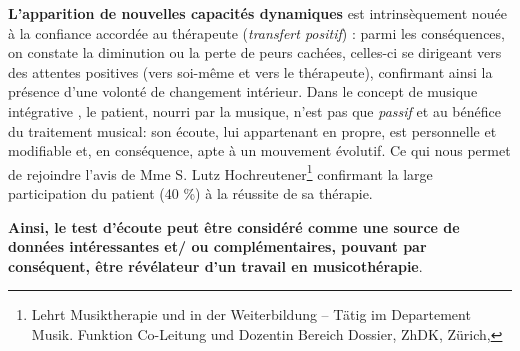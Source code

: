 \begin{itemize}
 \textbf{L'apparition de nouvelles
 	capacités  dynamiques }est intrinsèquement nouée à la confiance
 accordée au thérapeute (\textit{transfert positif})
 \autocite{roustang1986} : parmi les conséquences, on constate la
 diminution ou la perte de peurs cachées, celles-ci se dirigeant vers des
 attentes positives (vers soi-même et vers le thérapeute), confirmant ainsi la
 présence d'une volonté de changement intérieur.
 Dans le concept de musique intégrative \autocite{vrait_musicotherapie_2018},  le patient, nourri par
la musique, n'est pas que \textit{passif }et
au bénéfice  du traitement musical: son écoute, lui
appartenant en propre, est personnelle et modifiable %
et, en conséquence, apte à un mouvement évolutif.
Ce qui nous permet de rejoindre l'avis de Mme S. Lutz
Hochreutener\footnote{Lehrt Musiktherapie und in der Weiterbildung – Tätig
	im Departement Musik. Funktion Co-Leitung und Dozentin Bereich
	Dossier, ZhDK, Zürich, %
}
confirmant la large participation du patient (40 \%) à la réussite de sa thérapie.


  
  \end{itemize}

  \textbf{Ainsi, le test
  d'écoute peut être considéré comme une source de données
   intéressantes et/ ou complémentaires, pouvant par conséquent, être
  \textbf{révélateur d'un
  travail en musicothérapie}}.



